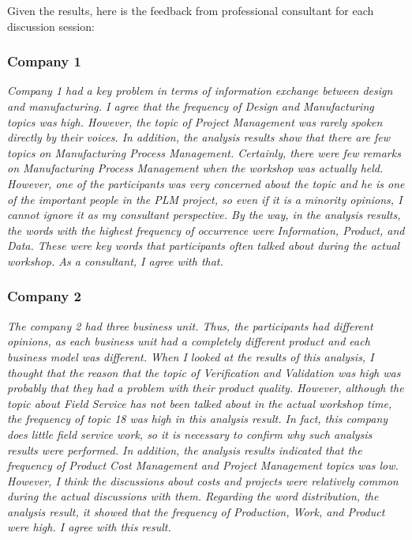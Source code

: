 \documentclass[10pt, conference, compsocconf]{IEEEtran}
\begin{document}
Given the results, here is the feedback from professional consultant for each discussion session:
\medskip

\subsubsection{Company 1}
{\it Company 1 had a key problem in terms of information exchange between design and manufacturing. I agree that the frequency of Design and Manufacturing topics was high. However, the topic of Project Management was rarely spoken directly by their voices. In addition, the analysis results show that there are few topics on Manufacturing Process Management. Certainly, there were few remarks on Manufacturing Process Management when the workshop was actually held. However, one of the participants was very concerned about the topic and he is one of the important people in the PLM project, so even if it is a minority opinions, I cannot ignore it as my consultant perspective. By the way, in the analysis results, the words with the highest frequency of occurrence were Information, Product, and Data. These were key words that participants often talked about during the actual workshop. As a consultant, I agree with that.}
\smallskip

\subsubsection{Company 2}
{\it The company 2 had three business unit. Thus, the participants had different opinions, as each business unit had a completely different product and each business model was different. When I looked at the results of this analysis, I thought that the reason that the topic of Verification and Validation was high was probably that they had a problem with their product quality. However, although the topic about Field Service has not been talked about in the actual workshop time, the frequency of topic 18 was high in this analysis result. In fact, this company does little field service work, so it is necessary to confirm why such analysis results were performed. In addition, the analysis results indicated that the frequency of Product Cost Management and Project Management topics was low. However, I think the discussions about costs and projects were relatively common during the actual discussions with them. Regarding the word distribution, the analysis result, it showed that the frequency of Production, Work, and Product were high. I agree with this result.}
\smallskip
\end{document}
